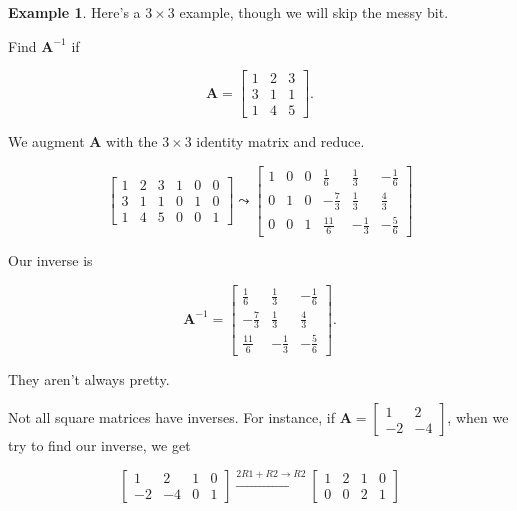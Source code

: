 \documentclass[
]{book}
\theoremstyle{definition}
\theoremstyle{definition}
\newtheorem{example}{Example}[chapter]
\theoremstyle{definition}
\theoremstyle{definition}
\theoremstyle{remark}
\begin{document}
\begin{examplebox}

\begin{example}
\protect\hypertarget{exm:3b3inv}{}\label{exm:3b3inv}Here's a \(3\times 3\) example, though we will skip the messy bit.

Find \(\mathbf{A}^{-1}\) if

\[\mathbf{A}=\begin{bmatrix} 1 & 2 & 3\\3 & 1 & 1\\1 & 4 & 5\end{bmatrix}.\]

We augment \(\mathbf{A}\) with the \(3\times 3\) identity matrix and reduce.

\[\left[\begin{array}{ccc|ccc} 1 & 2 & 3 & 1 & 0 & 0\\3 & 1 & 1 & 0 & 1 & 0\\1 & 4 & 5 & 0 & 0 & 1\end{array}\right] \leadsto \left[\begin{array}{ccc|ccc} 1 & 0 & 0 & \frac{1}{6} & \frac{1}{3} & -\frac{1}{6}\\0 & 1 & 0 & -\frac{7}{3} & \frac{1}{3} & \frac{4}{3} \\ 0 & 0 & 1 & \frac{11}{6} & -\frac{1}{3} & -\frac{5}{6}\end{array}\right]\]

Our inverse is

\[\mathbf{A}^{-1}=\begin{bmatrix}\frac{1}{6} & \frac{1}{3} & -\frac{1}{6}\\-\frac{7}{3} & \frac{1}{3} & \frac{4}{3} \\ \frac{11}{6} &-\frac{1}{3} & -\frac{5}{6}\end{bmatrix}.\]

They aren't always pretty.
\end{example}

\end{examplebox}

Not all square matrices have inverses. For instance, if \(\mathbf{A}=\displaystyle{\begin{bmatrix}
1 & 2\\ -2 & -4
\end{bmatrix}}\), when we try to find our inverse, we get

\[\left[\begin{array}{rr|rr}
    1 & 2 & 1 & 0\\
    -2 & -4 & 0 & 1
\end{array}\right]\xrightarrow{2R1+R2\to R2}
\left[\begin{array}{rr|rr}
    1 & 2 & 1 & 0  \\
    0 & 0 & 2 & 1
\end{array}\right]\]
\end{document}
